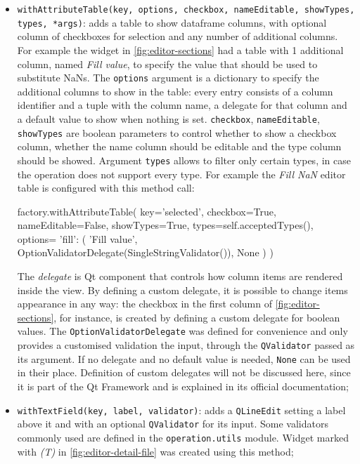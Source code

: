 \begin{itemize}
	\item \texttt{withAttributeTable(key, options, checkbox, nameEditable, showTypes, types, *args)}: adds a table to show dataframe columns, with optional column of checkboxes for selection and any number of additional columns. For example the widget in \cref{fig:editor-sections} had a table with 1 additional column, named \textit{Fill value}, to specify the value that should be used to substitute NaNs. The \texttt{options} argument is a dictionary to specify the additional columns to show in the table: every entry consists of a column identifier and a tuple with the column name, a delegate for that column and a default value to show when nothing is set. \texttt{checkbox}, \texttt{nameEditable}, \texttt{showTypes} are boolean parameters to control whether to show a checkbox column, whether the name column should be editable and the type column should be showed. Argument \texttt{types} allows to filter only certain types, in case the operation does not support every type. For example the \textit{Fill NaN} editor table is configured with this method call:
	\begin{python}[emph={withAttributeTable}]
		factory.withAttributeTable(
		key='selected', 
		checkbox=True, 
		nameEditable=False,
		showTypes=True,
		types=self.acceptedTypes(),
		options={
			'fill': (
			'Fill value',
			OptionValidatorDelegate(SingleStringValidator()),
			None
			)
		})
	\end{python}
	The \textit{delegate} is Qt component that controls how column items are rendered inside the view. By defining a custom delegate, it is possible to change items appearance in any way: the checkbox in the first column of \cref{fig:editor-sections}, for instance, is created by defining a custom delegate for boolean values. The \texttt{OptionValidatorDelegate} was defined for convenience and only provides a customised validation the input, through the \texttt{QValidator} passed as its argument. If no delegate and no default value is needed, \texttt{None} can be used in their place. Definition of custom delegates will not be discussed here, since it is part of the Qt Framework and is explained in its official documentation;
	\item \texttt{withTextField(key, label, validator)}: adds a \texttt{QLineEdit} setting a label above it and with an optional \texttt{QValidator} for its input. Some validators commonly used are defined in the \texttt{operation.utils} module. Widget marked with \textit{(T)} in \cref{fig:editor-detail-file} was created using this method; 

\end{itemize}

